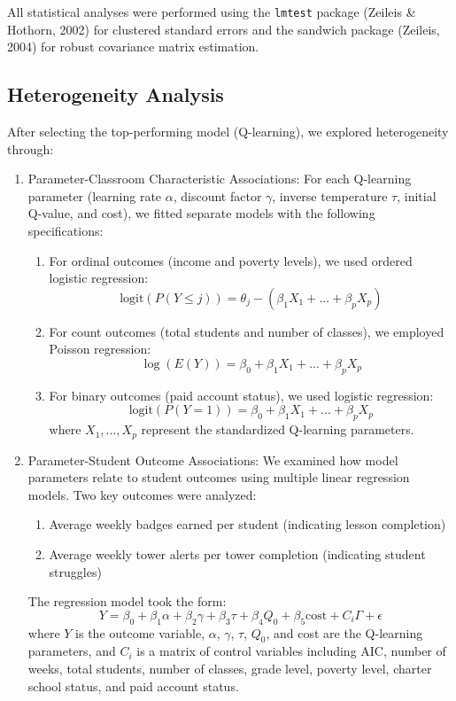 \documentclass[
  number,
  preprint,
  3p,
  onecolumn]{elsarticle}
\providecommand{\tightlist}{%
  \setlength{\itemsep}{0pt}\setlength{\parskip}{0pt}}\usepackage{longtable,booktabs,array}
\begin{document}
All statistical analyses were performed using the \texttt{lmtest}
package (Zeileis \& Hothorn, 2002) for clustered standard errors and the
sandwich package (Zeileis, 2004) for robust covariance matrix
estimation.

\subsection{Heterogeneity Analysis}\label{heterogeneity-analysis}

After selecting the top-performing model (Q-learning), we explored
heterogeneity through:

\begin{enumerate}
\def\labelenumi{\arabic{enumi}.}
\item
  Parameter-Classroom Characteristic Associations: For each Q-learning
  parameter (learning rate \(\alpha\), discount factor \(\gamma\),
  inverse temperature \(\tau\), initial Q-value, and cost), we fitted
  separate models with the following specifications:

  \begin{enumerate}
  \def\labelenumii{\alph{enumii})}
  \tightlist
  \item
    For ordinal outcomes (income and poverty levels), we used ordered
    logistic regression: \[
    \text{logit}(P(Y \leq j)) = \theta_j - (\beta_1X_1 + ... + \beta_pX_p)
    \]
  \item
    For count outcomes (total students and number of classes), we
    employed Poisson regression: \[
    \log(E(Y)) = \beta_0 + \beta_1X_1 + ... + \beta_pX_p
    \]
  \item
    For binary outcomes (paid account status), we used logistic
    regression: \[
    \text{logit}(P(Y=1)) = \beta_0 + \beta_1X_1 + ... + \beta_pX_p
    \] where \(X_1, ..., X_p\) represent the standardized Q-learning
    parameters.
  \end{enumerate}
\item
  Parameter-Student Outcome Associations: We examined how model
  parameters relate to student outcomes using multiple linear regression
  models. Two key outcomes were analyzed:

  \begin{enumerate}
  \def\labelenumii{\alph{enumii})}
  \tightlist
  \item
    Average weekly badges earned per student (indicating lesson
    completion)
  \item
    Average weekly tower alerts per tower completion (indicating student
    struggles)
  \end{enumerate}

  The regression model took the form: \[
  Y = \beta_0 + \beta_1\alpha + \beta_2\gamma + \beta_3\tau + \beta_4Q_0 + \beta_5\text{cost} + C_i\Gamma + \epsilon
  \] where \(Y\) is the outcome variable, \(\alpha\), \(\gamma\),
  \(\tau\), \(Q_0\), and cost are the Q-learning parameters, and \(C_i\)
  is a matrix of control variables including AIC, number of weeks, total
  students, number of classes, grade level, poverty level, charter
  school status, and paid account status.
\end{enumerate}
\end{document}
